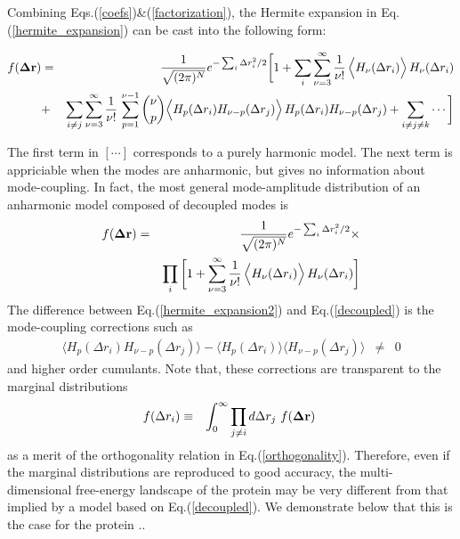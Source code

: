 \documentclass[prl,nofootinbib,twocolumn,floatfix,showpacs]{revtex4}
\begin{document}
Combining Eqs.(\ref{coefs})\&(\ref{factorization}), the Hermite
expansion in Eq.(\ref{hermite_expansion}) can be cast into the
following form:
\begin{widetext}
\begin{eqnarray}
\label{hermite_expansion2}
f({\bf\Delta r}) &=& \frac{1}{\sqrt{(2\pi)^N}} e^{ -\sum_i \Delta
  r_i^2/2} \bigg[ 1 + \sum_i\sum_{\nu=3}^\infty
  \frac{1}{\nu!}\, \Big\langle
  H_\nu(\Delta r_i)\Big\rangle\,H_\nu(\Delta r_i) \nonumber \\
&+&  \sum_{i\ne j}\sum_{\nu=3}^\infty
  \frac{1}{\nu!}\,\sum_{p=1}^{\nu-1} {\nu\choose p} \Big\langle
  H_p(\Delta r_i)H_{\nu-p}(\Delta r_j)\Big\rangle\,H_p(\Delta r_i)H_{\nu-p}(\Delta r_j) + \sum_{i\ne j\ne k} \cdots \bigg]
\end{eqnarray}
\end{widetext}
The first term in $[\cdots]$ corresponds to a purely harmonic
model. The next term is appriciable when the modes are anharmonic, but
gives no information about mode-coupling. In fact, the most general
mode-amplitude distribution of an anharmonic model composed of
decoupled modes is
\begin{eqnarray}
\label{decoupled}
f({\bf\Delta r}) &=& \frac{1}{\sqrt{(2\pi)^N}} e^{ -\sum_i \Delta
  r_i^2/2}\times \nonumber \\ && \prod_i \bigg[ 1 + \sum_{\nu=3}^\infty
  \frac{1}{\nu!}\, \Big\langle
  H_\nu(\Delta r_i)\Big\rangle\,H_\nu(\Delta r_i)\bigg]
\end{eqnarray}
The difference between Eq.(\ref{hermite_expansion2}) and
Eq.(\ref{decoupled}) is the mode-coupling corrections such as
\begin{eqnarray}
\langle H_p(\Delta r_i)H_{\nu-p}(\Delta r_j)\rangle - \langle
H_p(\Delta r_i)\rangle\langle H_{\nu-p}(\Delta r_j)\rangle &\neq& 0 \nonumber
\end{eqnarray}
and higher order cumulants. Note that, these corrections are transparent to the
marginal distributions
\begin{eqnarray}
\label{marginal}
f(\Delta r_i) &\equiv& \int_0^\infty \prod_{j\ne i}d\Delta r_j\ f({\bf\Delta r})\ 
\end{eqnarray}
as a merit of the orthogonality relation in
Eq.(\ref{orthogonality}). Therefore, even if the marginal
distributions are reproduced to good accuracy, the multi-dimensional
free-energy landscape of the protein may be very different from that
implied by a model based on Eq.(\ref{decoupled}). We demonstrate below
that this is the case for the protein ..

\begin{thebibliography}{99}

\bibitem{Flory}{Flory, 1976.}

\end{thebibliography}
\end{document}
